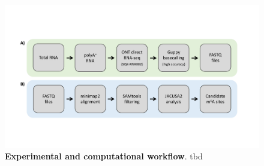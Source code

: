 \documentclass[times, 11pt, a4paper]{article}
\begin{document}
\begin{figure}[h!]
    \includegraphics[width = 1\textwidth]{Figure3.pdf}
  \caption{\textbf{Experimental and computational workflow}. tbd}
  \label{fig:workflow}
      \end{figure}
\newpage
\end{document}
